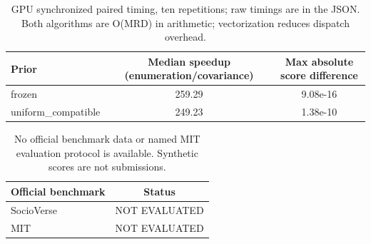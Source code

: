 \begin{table}[t]
\centering
\small
\caption{GPU synchronized paired timing, ten repetitions; raw timings are in the JSON. Both algorithms are O(MRD) in arithmetic; vectorization reduces dispatch overhead.}
\begin{tabular}{lcc}
\toprule
Prior & Median speedup (enumeration/covariance) & Max absolute score difference \\
\midrule
frozen & 259.29 & 9.08e-16 \\
uniform\_compatible & 249.23 & 1.38e-10 \\
\bottomrule
\end{tabular}
\end{table}
\begin{table}[t]
\centering
\small
\caption{No official benchmark data or named MIT evaluation protocol is available. Synthetic scores are not submissions.}
\begin{tabular}{lc}
\toprule
Official benchmark & Status \\
\midrule
SocioVerse & NOT EVALUATED \\
MIT & NOT EVALUATED \\
\bottomrule
\end{tabular}
\end{table}
